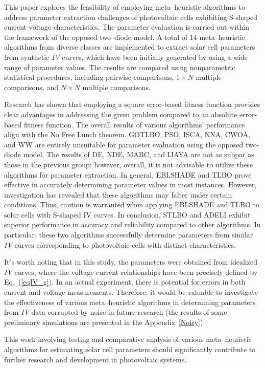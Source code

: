 \documentclass[a4paper,fleqn]{cas-sc}
\begin{document}
This paper explores the feasibility of employing meta--heuristic algorithms
to address parameter extraction challenges of photovoltaic cells
exhibiting S-shaped current-voltage characteristics.
The parameter evaluation is carried out within the framework of the opposed two--diode model.
A total of 14 meta--heuristic algorithms from diverse classes are implemented
to extract solar cell parameters from synthetic \emph{IV} curves,
which have been initially generated by using a wide range of parameter values.
The results are compared using nonparametric statistical procedures,
including pairwise comparisons,  $1\times N$ multiple comparisons, and $N\times N$ multiple comparisons.

Research has shown that employing
a square error-based fitness function provides
clear advantages in addressing the given problem compared to
an absolute error-based fitness function.
The overall results of various algorithms' performance align with the No Free Lunch theorem.
GOTLBO, PSO, ISCA, NNA, CWOA, and WW are entirely unsuitable for parameter evaluation using the opposed two-diode model.
The results of DE, NDE, MABC, and IJAYA are not as subpar as those in the previous group;
however, overall, it is not advisable to utilize these algorithms for parameter extraction.
In general, EBLSHADE and TLBO prove effective in accurately determining parameter values in most instances.
However, investigation has revealed that these algorithms may falter under certain conditions.
Thus, caution is warranted when applying EBLSHADE and TLBO to solar cells with S-shaped IV curves.
In conclusion, STLBO and ADELI exhibit superior performance in accuracy and reliability compared to other algorithms.
In particular, these two algorithms successfully determine parameters from similar \emph{IV} curves corresponding to photovoltaic cells with distinct characteristics.


It's worth noting that in this study,
the parameters were obtained from idealized \emph{IV} curves,
where the voltage-current relationships have been precisely defined by Eq.~(\ref{eqIV_g}).
In an actual experiment, there is potential for errors in both current and voltage measurements.
Therefore, it would be valuable to investigate the effectiveness of various meta--heuristic algorithms
in determining parameters from \emph{IV} data corrupted by noise in future research
(the results of some preliminary simulations are presented in the Appendix~\ref{Noisy}).


This work involving testing and comparative analysis of various meta--heuristic
algorithms for estimating solar cell parameters should significantly contribute
to further research and development in photovoltaic systems.
\end{document}
